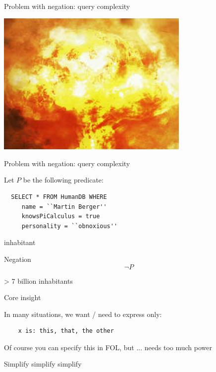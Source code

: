 \begin{frame}{Problem with negation: query complexity}
      \pause

    \begin{center}
    \includegraphics[height=7cm]{images/fire.jpg}
  \end{center}
\end{frame}


\begin{frame}[fragile]{Problem with negation: query complexity}

  Let $P$ be the following predicate:
\begin{verbatim}
  SELECT * FROM HumanDB WHERE
     name = ``Martin Berger''
     knowsPiCalculus = true
     personality = ``obnoxious''
\end{verbatim}

\VSPACE{} inhabitant


\VSPACE\pause
Negation
\[
\neg P
\]

\VSPACE\pause
> 7 billion  inhabitants

\end{frame}


\begin{frame}[fragile]{Core insight}

  \VSPACE\pause
  In many situations, we want / need to express only:

  \begin{verbatim}
    x is: this, that, the other
\end{verbatim}

  \VSPACE\pause
  Of course you can specify this in FOL, but ... needs too much power
\end{frame}


\begin{frame}
Simplify simplify simplify
\end{frame}


